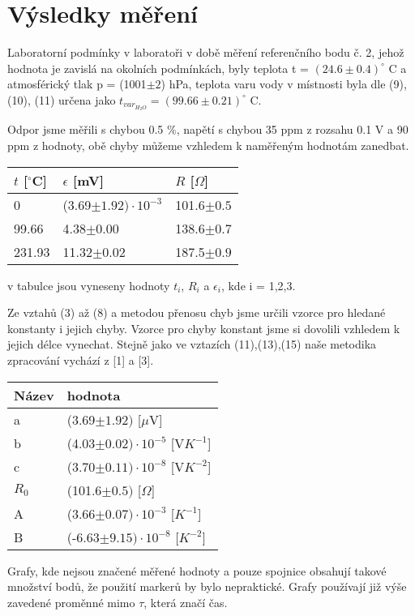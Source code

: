 \documentclass{article}
\begin{document}
\section*{Výsledky měření}
\par Laboratorní podmínky v laboratoři v době měření referenčního bodu č. 2, jehož hodnota je zavislá na okolních podmínkách, byly teplota t = $(24.6\pm0.4)^{\circ}$ C a atmosférický tlak p = (1001$\pm2$) hPa, teplota varu vody v místnosti byla dle (9), (10), (11) určena jako $t_{var_{H_{2}O}} = (99.66\pm0.21)^{\circ}$ C.
\par Odpor jsme měřili s chybou 0.5 $\%$, napětí s chybou 35 ppm z rozsahu 0.1 V a 90 ppm z hodnoty, obě chyby můžeme vzhledem k naměřeným hodnotám zanedbat.
\begin{center}
     \label{tab:title} 
    \begin{tabular}{ | l | l | p{5cm} |}
    \hline
    $t$ [$^{\circ}$C] & $\epsilon$ [mV]   & $R$ [$\Omega$] \\ \hline
    0 & (3.69$\pm1.92)\cdot10^{-3}$ & 101.6$\pm0.5$  \\ \hline
    99.66 & 4.38$\pm0.00$ & 138.6$\pm0.7$  \\ \hline
    231.93 & 11.32$\pm0.02$ & 187.5$\pm0.9$ \\ \hline
    \end{tabular}
\end{center}
v tabulce jsou vyneseny hodnoty $t_{i}$, $R_{i}$ a $\epsilon_{i}$, kde i = 1,2,3.

\par Ze vztahů (3) až (8) a metodou přenosu chyb jsme určili vzorce pro hledané konstanty i jejich chyby. Vzorce pro chyby konstant jsme si dovolili vzhledem k jejich délce vynechat. Stejně jako ve vztazích (11),(13),(15) naše metodika zpracování vychází z [1] a [3].
\begin{center}
     \label{tab:title} 
    \begin{tabular}{ | l | p{5cm} |}
    \hline
    Název & hodnota \\ \hline
    a & (3.69$\pm1.92)$ [$\mu$V]  \\ \hline
    b & (4.03$\pm0.02)\cdot10^{-5}$ [V$K^{-1}$] \\ \hline
    c & (3.70$\pm0.11)\cdot10^{-8}$ [V$K^{-2}$]  \\ \hline
    $R_{0}$ & (101.6$\pm0.5)$ [$\Omega$]  \\ \hline
    A & (3.66$\pm0.07)\cdot10^{-3}$ [$K^{-1}$] \\ \hline
    B & (-6.63$\pm9.15)\cdot10^{-8}$ [$K^{-2}$]\\ \hline
    \end{tabular}
\end{center}
\par Grafy, kde nejsou značené měřené hodnoty a pouze spojnice obsahují takové množství bodů, že použití markerů by bylo nepraktické. Grafy používají již výše zavedené proměnné mimo $\tau$, která značí čas.
\end{document}
